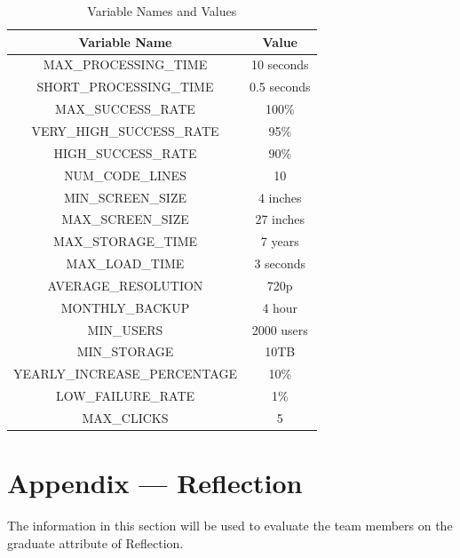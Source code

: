 \documentclass[12pt, titlepage]{article}
\begin{document}
\begin{table}[h!]
  \centering
  \begin{tabular}{|c|c|}
      \hline
      \textbf{Variable Name} & \textbf{Value} \\
      \hline
      MAX\_PROCESSING\_TIME & 10 seconds \\
      \hline
      SHORT\_PROCESSING\_TIME & 0.5 seconds \\
      \hline
      MAX\_SUCCESS\_RATE & 100\% \\
      \hline
      VERY\_HIGH\_SUCCESS\_RATE & 95\% \\
      \hline
      HIGH\_SUCCESS\_RATE & 90\% \\
      \hline
      NUM\_CODE\_LINES & 10 \\
      \hline
      MIN\_SCREEN\_SIZE & 4 inches \\
      \hline
      MAX\_SCREEN\_SIZE & 27 inches \\
      \hline
      MAX\_STORAGE\_TIME & 7 years \\
      \hline
      MAX\_LOAD\_TIME & 3 seconds \\
      \hline
      AVERAGE\_RESOLUTION & 720p \\
      \hline
      MONTHLY\_BACKUP & 4 hour \\
      \hline
      MIN\_USERS & 2000 users \\
      \hline
      MIN\_STORAGE & 10TB \\
      \hline
      YEARLY\_INCREASE\_PERCENTAGE & 10\% \\
      \hline
      LOW\_FAILURE\_RATE & 1\% \\
      \hline
      MAX\_CLICKS & 5 \\
      \hline
  \end{tabular}
  \caption{Variable Names and Values}
  \label{tab:variables}
\end{table}

\newpage{}

\section*{Appendix --- Reflection}

The information in this section will be used to evaluate the team members on the
graduate attribute of Reflection.


\end{document}
